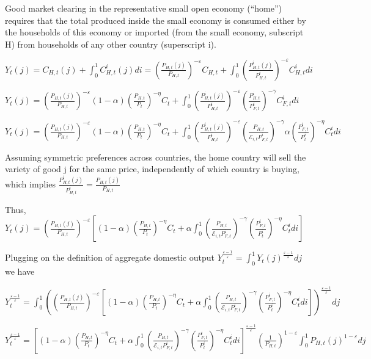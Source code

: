\documentclass[
]{article}
\begin{document}
Good market clearing in the representative small open economy (``home'')
requires that the total produced inside the small economy is consumed
either by the households of this economy or imported (from the small
economy, subscript H) from households of any other country (superscript
i).

\(\displaystyle Y_t(j) = C_{H,t}(j)+\int_0^1 C_{H,t}^i(j)di = \left( \frac{P_{H,t}(j)}{P_{H,t}}\right)^{-\varepsilon}C_{H,t} + \int_0^1 \displaystyle \left( \frac{P_{H,t}^i(j)}{P_{H,t}^i}\right)^{-\varepsilon}C_{H,t}^i di\)

\(\displaystyle Y_t(j) = \left( \frac{P_{H,t}(j)}{P_{H,t}}\right)^{-\varepsilon} (1-\alpha)\left( \frac{P_{H,t}}{P_t} \right)^{-\eta}C_t + \int_0^1 \left( \frac{P_{H,t}^i(j)}{P_{H,t}^i}\right)^{-\varepsilon} \left( \frac{P_{H,t}^i}{P_{F,t}^i}\right)^{-\gamma}C_{F,t}^i di\)

\(\displaystyle Y_t(j) = \left( \frac{P_{H,t}(j)}{P_{H,t}}\right)^{-\varepsilon} (1-\alpha)\left( \frac{P_{H,t}}{P_t} \right)^{-\eta}C_t + \int_0^1 \left( \frac{P_{H,t}^i(j)}{P_{H,t}^i}\right)^{-\varepsilon} \left( \frac{P_{H,t}}{\mathcal{E}_{i,t}P_{F,t}^i}\right)^{-\gamma} \alpha \left( \frac{P_{F,t}^i}{P_t^i} \right)^{-\eta} C_t^i di\)

Assuming symmetric preferences across countries, the home country will
sell the variety of good j for the same price, independently of which
country is buying, which implies
\(\displaystyle \frac{P_{H,t}^i (j)}{P_{H,t}^i}=\frac{P_{H,t} (j)}{P_{H,t}}\)

Thus,
\(\displaystyle Y_t(j) = \left( \frac{P_{H,t}(j)}{P_{H,t}}\right)^{-\varepsilon} \left[ (1-\alpha)\left( \frac{P_{H,t}}{P_t} \right)^{-\eta}C_t + \alpha \int_0^1 \left( \frac{P_{H,t}}{\mathcal{E}_{i,t}P_{F,t}^i}\right)^{-\gamma} \left( \frac{P_{F,t}^i}{P_t^i} \right)^{-\eta} C_t^i di \right]\)

Plugging on the definition of aggregate domestic output
\(\displaystyle Y_t^{\frac{\varepsilon-1}{\varepsilon}}= \int_0^1Y_t(j)^{\frac{\varepsilon-1}{\varepsilon}}dj\)
we have

\(\displaystyle Y_t^{\frac{\varepsilon-1}{\varepsilon}} = \int_0^1 \left( \left( \frac{P_{H,t}(j)}{P_{H,t}}\right)^{-\varepsilon} \left[ (1-\alpha)\left( \frac{P_{H,t}}{P_t} \right)^{-\eta}C_t + \alpha \int_0^1 \left( \frac{P_{H,t}}{\mathcal{E}_{i,t}P_{F,t}^i}\right)^{-\gamma} \left( \frac{P_{F,t}^i}{P_t^i} \right)^{-\eta} C_t^i di \right] \right)^{\frac{\varepsilon-1}{\varepsilon}}dj\)

\(\displaystyle Y_t^{\frac{\varepsilon-1}{\varepsilon}} = \left[ (1-\alpha)\left( \frac{P_{H,t}}{P_t} \right)^{-\eta}C_t + \alpha \int_0^1 \left( \frac{P_{H,t}}{\mathcal{E}_{i,t}P_{F,t}^i}\right)^{-\gamma} \left( \frac{P_{F,t}^i}{P_t^i} \right)^{-\eta} C_t^i di \right]^{\frac{\varepsilon-1}{\varepsilon}} \left( \frac{1}{P_{H,t}}\right)^{1-\varepsilon} \int_0^1 P_{H,t}(j) ^{1-\varepsilon} dj\)
\end{document}
